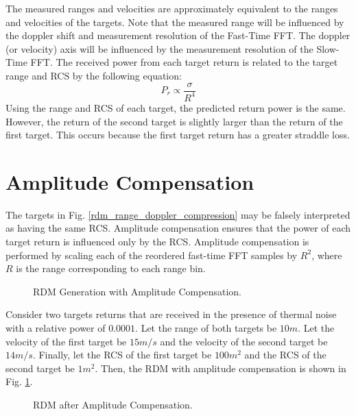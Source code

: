 \documentclass[conference]{IEEEtran}
\begin{document}
\noindent
The measured ranges and velocities are approximately equivalent to the ranges and velocities of the targets. Note that the measured range will be influenced by the doppler shift and measurement resolution of the Fast-Time FFT. The doppler (or velocity) axis will be influenced by the measurement resolution of the Slow-Time FFT.
\noindent
The received power from each target return is related to the target range and RCS by the following equation:
\begin{equation}
P_r \propto \frac{\sigma}{R^4}
\end{equation}
Using the range and RCS of each target, the predicted return power is the same. However, the return of the second target is slightly larger than the return of the first target. This occurs because the first target return has a greater straddle loss. 
\section{Amplitude Compensation}
\label{amp_comp_section}
The targets in Fig. \ref{rdm_range_doppler_compression} may be falsely interpreted as having the same RCS. Amplitude compensation ensures that the power of each target return is influenced only by the RCS. Amplitude compensation is performed by scaling each of the reordered fast-time FFT samples by $R^2$, where $R$ is the range corresponding to each range bin.
\begin{figure}[H]
\centerline{}
\caption{RDM Generation with Amplitude Compensation.}
\end{figure}
Consider two targets returns that are received in the presence of thermal noise with a relative power of $0.0001$. Let the range of both targets be $10m$. Let the velocity of the first target be $15m/s$ and the velocity of the second target be $14m/s$. Finally, let the RCS of the first target be $100m^2$ and the RCS of the second target be $1m^2$. Then, the RDM with amplitude compensation is shown in Fig. \ref{rdm_amplitude_compensation}.
\begin{figure}[H]
\centerline{}
\caption{RDM after Amplitude Compensation.}
\label{rdm_amplitude_compensation}
\end{figure}
\end{document}
